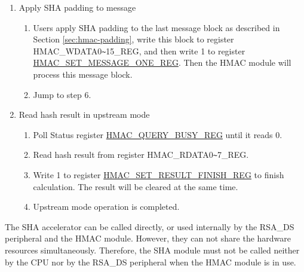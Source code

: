 \documentclass[main\_\_EN.tex]{subfiles}
\begin{document}
\begin{enumerate}
\begin{enumerate}
\begin{itemize}
\begin{enumerate}
                \item If Block\_\textcolor{red}{n} is the second last padded block, write 1 to register\\ \hyperref[regdesc:HMACSETMESSAGEPADREG]{HMAC\_SET\_MESSAGE\_PAD\_REG}, and then jump to step 5.
                \item If Block\_\textcolor{red}{n} is neither the last nor the second last message block, write 1 to register \\\hyperref[regdesc:HMACSETMESSAGEINGREG]{HMAC\_SET\_MESSAGE\_ING\_REG} and define $n=n+1$, and then jump to step 4.(b).
            \end{enumerate}
        \end{itemize}
    \end{enumerate}

    \item Apply SHA padding to message
    \begin{enumerate}
        \item Users apply SHA padding to the last message block as described in Section \ref{sec:hmac-padding}, write this block to register HMAC\_WDATA0\verb+~+15\_REG, and then write 1 to register \hyperref[regdesc:HMACSETMESSAGEONEREG]{HMAC\_SET\_MESSAGE\_ONE\_REG}. Then the HMAC module will process this message block.
        \item Jump to step 6.
    \end{enumerate}

    \item Read hash result in upstream mode
    \begin{enumerate}
        \item Poll Status register \hyperref[regdesc:HMACQUERYBUSYREG]{HMAC\_QUERY\_BUSY\_REG} until it reads 0.
        \item Read hash result from register HMAC\_RDATA0\verb+~+7\_REG.
        \item Write 1 to register \hyperref[regdesc:HMACSETRESULTFINISHREG]{HMAC\_SET\_RESULT\_FINISH\_REG} to finish calculation. The result will be cleared at the same time.
        \item Upstream mode operation is completed.
    \end{enumerate}

\end{enumerate}

\begin{tiplisting}
    The SHA accelerator can be called directly, or used internally by the RSA\_DS peripheral and the HMAC module. However, they can not share the hardware resources simultaneously. Therefore, the SHA module must not be called neither by the CPU nor by the RSA\_DS peripheral when the HMAC module is in use.
\end{tiplisting}
\end{document}
